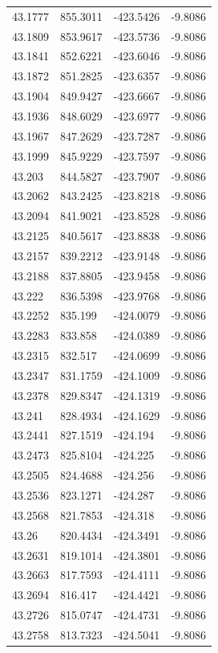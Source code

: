 \begin{table}[H]
\begin{tabular}{llll}
43.1777 & 855.3011 & -423.5426 & -9.8086 \\
43.1809 & 853.9617 & -423.5736 & -9.8086 \\
43.1841 & 852.6221 & -423.6046 & -9.8086 \\
43.1872 & 851.2825 & -423.6357 & -9.8086 \\
43.1904 & 849.9427 & -423.6667 & -9.8086 \\
43.1936 & 848.6029 & -423.6977 & -9.8086 \\
43.1967 & 847.2629 & -423.7287 & -9.8086 \\
43.1999 & 845.9229 & -423.7597 & -9.8086 \\
43.203 & 844.5827 & -423.7907 & -9.8086 \\
43.2062 & 843.2425 & -423.8218 & -9.8086 \\
43.2094 & 841.9021 & -423.8528 & -9.8086 \\
43.2125 & 840.5617 & -423.8838 & -9.8086 \\
43.2157 & 839.2212 & -423.9148 & -9.8086 \\
43.2188 & 837.8805 & -423.9458 & -9.8086 \\
43.222 & 836.5398 & -423.9768 & -9.8086 \\
43.2252 & 835.199 & -424.0079 & -9.8086 \\
43.2283 & 833.858 & -424.0389 & -9.8086 \\
43.2315 & 832.517 & -424.0699 & -9.8086 \\
43.2347 & 831.1759 & -424.1009 & -9.8086 \\
43.2378 & 829.8347 & -424.1319 & -9.8086 \\
43.241 & 828.4934 & -424.1629 & -9.8086 \\
43.2441 & 827.1519 & -424.194 & -9.8086 \\
43.2473 & 825.8104 & -424.225 & -9.8086 \\
43.2505 & 824.4688 & -424.256 & -9.8086 \\
43.2536 & 823.1271 & -424.287 & -9.8086 \\
43.2568 & 821.7853 & -424.318 & -9.8086 \\
43.26 & 820.4434 & -424.3491 & -9.8086 \\
43.2631 & 819.1014 & -424.3801 & -9.8086 \\
43.2663 & 817.7593 & -424.4111 & -9.8086 \\
43.2694 & 816.417 & -424.4421 & -9.8086 \\
43.2726 & 815.0747 & -424.4731 & -9.8086 \\
43.2758 & 813.7323 & -424.5041 & -9.8086 \\

\end{tabular}
\end{table}
